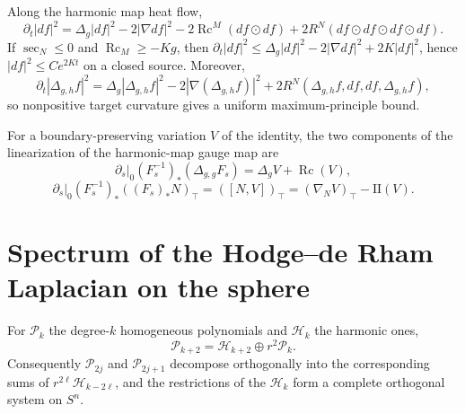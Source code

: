 \begin{lemma}
\label{lem:chow-iv-k18-energy-density}
Along the harmonic map heat flow,
\[
\partial_t|df|^2=\Delta_g|df|^2-2|\nabla df|^2
-2\operatorname{Rc}^M(df\odot df)+2R^N(df\odot df\odot df\odot df).
\]
If $\sec_N\le0$ and $\operatorname{Rc}_M\ge-Kg$, then
$\partial_t|df|^2\le\Delta_g|df|^2-2|\nabla df|^2+2K|df|^2$, hence
$|df|^2\le Ce^{2Kt}$ on a closed source.  Moreover,
\[
\partial_t|\Delta_{g,h}f|^2
=\Delta_g|\Delta_{g,h}f|^2-2|\nabla(\Delta_{g,h}f)|^2
+2R^N(\Delta_{g,h}f,df,df,\Delta_{g,h}f),
\]
so nonpositive target curvature gives a uniform maximum-principle bound.
\end{lemma}

\begin{remark}
\label{rem:chow-iv-k-linearization-boundary}
For a boundary-preserving variation $V$ of the identity, the two components of
the linearization of the harmonic-map gauge map are
\[
\left.\partial_s\right|_0(F_s^{-1})_*(\Delta_{g,g}F_s)=\Delta_gV+\operatorname{Rc}(V),
\]
\[
\left.\partial_s\right|_0(F_s^{-1})_*((F_s)_*N)_\top
=([N,V])_\top=(\nabla_NV)_\top-\mathrm{II}(V).
\]
\end{remark}

\section{Spectrum of the Hodge--de Rham Laplacian on the sphere}

\begin{proposition}
\label{prop:chow-iv-k19-harmonic-polynomial-decomposition}
For $\mathcal P_k$ the degree-$k$ homogeneous polynomials and $\mathcal H_k$
the harmonic ones,
\[
\mathcal P_{k+2}=\mathcal H_{k+2}\oplus r^2\mathcal P_k.
\]
Consequently $\mathcal P_{2j}$ and $\mathcal P_{2j+1}$ decompose orthogonally
into the corresponding sums of $r^{2\ell}\mathcal H_{k-2\ell}$, and the
restrictions of the $\mathcal H_k$ form a complete orthogonal system on $S^n$.
\end{proposition}


